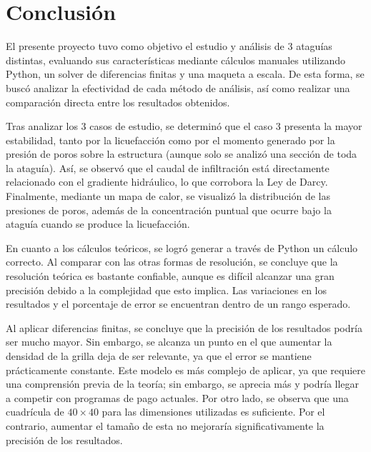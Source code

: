 \part{Conclusión}

El presente proyecto tuvo como objetivo el estudio y análisis de 3 ataguías distintas, evaluando sus características mediante cálculos manuales utilizando Python, un solver de diferencias finitas y una maqueta a escala. De esta forma, se buscó analizar la efectividad de cada método de análisis, así como realizar una comparación directa entre los resultados obtenidos.

\vspace{0.5cm}

Tras analizar los 3 casos de estudio, se determinó que el caso 3 presenta la mayor estabilidad, tanto por la licuefacción como por el momento generado por la presión de poros sobre la estructura (aunque solo se analizó una sección de toda la ataguía). Así, se observó que el caudal de infiltración está directamente relacionado con el gradiente hidráulico, lo que corrobora la Ley de Darcy. Finalmente, mediante un mapa de calor, se visualizó la distribución de las presiones de poros, además de la concentración puntual que ocurre bajo la ataguía cuando se produce la licuefacción.

\vspace{0.5cm}

En cuanto a los cálculos teóricos, se logró generar a través de Python un cálculo correcto. Al comparar con las otras formas de resolución, se concluye que la resolución teórica es bastante confiable, aunque es difícil alcanzar una gran precisión debido a la complejidad que esto implica. Las variaciones en los resultados y el porcentaje de error se encuentran dentro de un rango esperado.

\vspace{0.5cm}

Al aplicar diferencias finitas, se concluye que la precisión de los resultados podría ser mucho mayor. Sin embargo, se alcanza un punto en el que aumentar la densidad de la grilla deja de ser relevante, ya que el error se mantiene prácticamente constante. Este modelo es más complejo de aplicar, ya que requiere una comprensión previa de la teoría; sin embargo, se aprecia más y podría llegar a competir con programas de pago actuales. Por otro lado, se observa que una cuadrícula de $40 \times 40$ para las dimensiones utilizadas es suficiente. Por el contrario, aumentar el tamaño de esta no mejoraría significativamente la precisión de los resultados.

